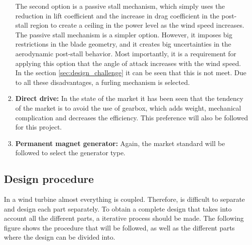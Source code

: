 \documentclass[../TFG_Report.tex]{subfiles}
\begin{document}
\begin{enumerate}

The second option is a passive stall mechanism, which simply uses the reduction in lift coefficient and the increase in drag coefficient in the post-stall region to create a ceiling in the power level as the wind speed increases. \\

The passive stall mechanism is a simpler option. However, it imposes big restrictions in the blade geometry, and it creates big uncertainties in the aerodynamic post-stall behavior. Most importantly, it is a requirement for applying this option that the angle of attack increases with the wind speed. In the section \ref{sec:design_challenge} it can be seen that this is not meet. Due to all these disadvantages, a furling mechanism is selected. \\


\item \textbf{Direct drive:} In the state of the market it has been seen that the tendency of the market is to avoid the use of gearbox, which adds weight, mechanical complication and decreases the efficiency. This preference will also be followed for this project. \\

\item \textbf{Permanent magnet generator: } Again, the market standard will be followed to select the generator type. %
	 
\end{enumerate}




\subsection{Design procedure}

In a wind turbine almost everything is coupled. Therefore, is difficult to separate and design each part separately. To obtain a complete design that takes into account all the different parts, a iterative process should be made. The following figure shows the procedure that will be followed, as well as the different parts where the design can be divided into.  \\









	
	
\end{document}
